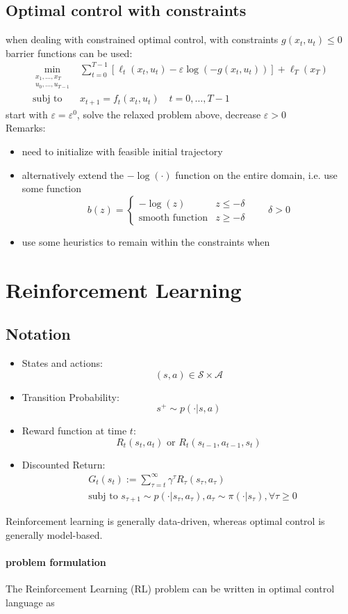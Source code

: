 \documentclass[openany]{book}
\theoremstyle{definition}
\theoremstyle{remark}
\begin{document}
\section{Optimal control with constraints}
when dealing with constrained optimal control, with constraints $g(x_t,u_t)\leq 0$ barrier functions can be used: 
\begin{align*}
    \min_{\substack{x_1,\dots,x_T\\u_0,...,u_{T-1}}} & \displaystyle\sum_{t=0}^{T-1}[\ell_t(x_t,u_t)-\varepsilon\log(-g(x_t,u_t))]+\ell_T(x_T)\\
    \text{subj to } &x_{t+1}=f_t(x_t,u_t) \quad t=0,\dots,T-1
\end{align*}
start with $\varepsilon=\varepsilon^0$, solve the relaxed problem above, decrease $\varepsilon>0$\\
Remarks: \begin{itemize}
    \item need to initialize with feasible initial trajectory 
        \item alternatively extend the $-\log(\cdot)$ function on the entire domain, i.e. use some function \[
            b(z)= \begin{cases}
                -\log(z) & z\leq -\delta\\
                \text{smooth function} & z\geq -\delta
            \end{cases} \qquad \delta>0
        \]
        \item use some heuristics to remain within the constraints when
\end{itemize}


\chapter{Reinforcement Learning}
\section{Notation}
\begin{itemize}
    \item States and actions:
        \[
            (s,a)\in\mathcal{S}\times\mathcal{A}
        \]
        \item Transition Probability:
            \[
                s^+ \sim p(\cdot|s,a)
            \]
        \item Reward function at time $t$:
            \[
                R_t(s_t,a_t) \text{ or } R_t(s_{t-1},a_{t-1},s_t)
            \]
            
            \item Discounted Return: \begin{align*}
               &G_t(s_t):=\displaystyle\sum_{\tau=t}^{\infty}\gamma^\tau R_\tau(s_\tau,a_\tau) \\
               &\text{subj to } s_{\tau+1}\sim p(\cdot|s_\tau,a_\tau),a_\tau\sim \pi(\cdot|s_\tau),\forall \tau \geq 0
            \end{align*}
                
\end{itemize}
Reinforcement learning is generally data-driven, whereas optimal control is generally model-based.
\subsubsection{problem formulation}
The Reinforcement Learning (RL) problem can be written in optimal control language as 
\end{document}
